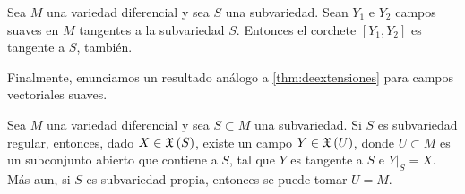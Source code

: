 \begin{coroTangentesCorcheteCerrados}\label{thm:tangentescorchetecerrados}
	Sea $M$ una variedad diferencial y sea $S$ una subvariedad. Sean
	$Y_{1}$ e $Y_{2}$ campos suaves en $M$ tangentes a la subvariedad
	$S$. Entonces el corchete $[Y_{1},Y_{2}]$ es tangente a $S$,
	tambi\'{e}n.
\end{coroTangentesCorcheteCerrados}

Finalmente, enunciamos un resultado an\'{a}logo a \ref{thm:deextensiones}
para campos vectoriales suaves.

\begin{lemaExtenderCampos}\label{thm:extendercampos}
	Sea $M$ una variedad diferencial y sea $S\subset M$ una subvariedad.
	Si $S$ es subvariedad regular, entonces, dado $X\in\mathfrak{X}\left(S\right)$,
	existe un campo $Y\in\mathfrak{X}\left(U\right)$, donde $U\subset M$ es un
	subconjunto abierto que contiene a $S$, tal que $Y$ es tangente
	a $S$ e $Y|_{S}=X$. M\'{a}s aun, si $S$ es subvariedad propia,
	entonces se puede tomar $U=M$.
\end{lemaExtenderCampos}

